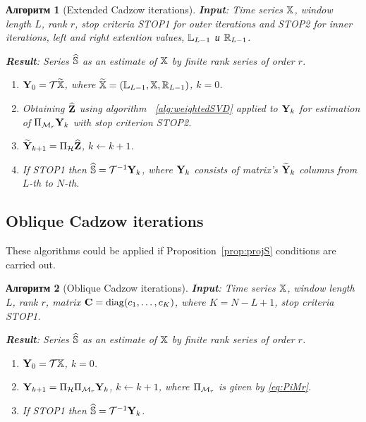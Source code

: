\documentclass[12pt,a4paper,fleqn,leqno]{article}
\newtheorem{algorithm}{Алгоритм}
\begin{document}
\begin{algorithm}[Extended Cadzow iterations]
\textbf{Input}: Time series $\mathbb{X}$, window length $L$, rank $r$,
stop criteria STOP1 for outer iterations and STOP2 for inner iterations,
left and right extention values, $\mathbb{L}_{L-1}$ и $\mathbb{R}_{L-1}$.

\textbf{Result}:
Series $\widehat{\mathbb{S}}$ as an estimate of $\mathbb{X}$ by finite rank series of order $r$.

\begin{enumerate}
\item
$\mathbf{Y}_0 = \mathcal{T} \widetilde{\mathbb{X}}$, where $\widetilde{\mathbb{X}}=(\mathbb{L}_{L-1}, \mathbb{X}, \mathbb{R}_{L-1})$, $k=0$.
\item
Obtaining $\widehat{\mathbf{Z}}$ using algorithm ~\ref{alg:weightedSVD} applied to $\mathbf{Y}_k$ for estimation of $\Pi_{\mathcal{M}_r} \mathbf{Y}_{k}$ with stop criterion STOP2.
\item
$\widetilde{\mathbf{Y}}_{k+1} = \Pi_{\mathcal{H}}  \widehat{\mathbf{Z}}$, $k\leftarrow k+1$.
\item
If STOP1 then $\widehat{\mathbb{S}} = \mathcal{T}^{-1} \mathbf{Y}_k$, where $\mathbf{Y}_k$ consists of matrix's $\widetilde{\mathbf{Y}}_{k}$ columns from $L$-th to $N$-th.
\end{enumerate}
\end{algorithm}


\subsection{Oblique Cadzow iterations}

These algorithms could be applied if Proposition~\ref{prop:projS} conditions are carried out.

\begin{algorithm}[Oblique Cadzow iterations]
\label{alg:obliqueCadzow}
\textbf{Input}: Time series $\mathbb{X}$, window length $L$, rank $r$, matrix $\mathbf{C}=\mathop{\mathrm{diag}}(c_1,\ldots, c_K)$, where $K=N-L+1$,
stop criteria STOP1.

\textbf{Result}:
Series $\widehat{\mathbb{S}}$ as an estimate of $\mathbb{X}$ by finite rank series of order $r$.

\begin{enumerate}
\item
$\mathbf{Y}_0 = \mathcal{T} \mathbb{X}$, $k=0$.
\item
$\mathbf{Y}_{k+1} = \Pi_{\mathcal{H}}  \Pi_{\mathcal{M}_r} \mathbf{Y}_{k}$, $k\leftarrow k+1$, where
$\Pi_{\mathcal{M}_r}$ is given by \eqref{eq:PiMr}.
\item
If STOP1 then $\widehat{\mathbb{S}} = \mathcal{T}^{-1} \mathbf{Y}_k$.
\end{enumerate}
\end{algorithm}
\end{document}
